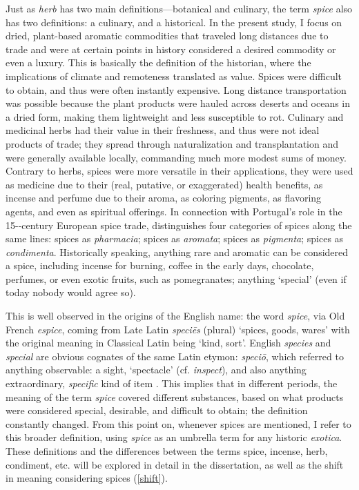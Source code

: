 Just as \textit{herb} has two main definitions---botanical and culinary, the term \textit{spice} also has two definitions: a culinary, and a historical. In the present study, I focus on dried, plant-based aromatic commodities that traveled long distances due to trade and were at certain points in history considered a desired commodity or even a luxury. This is basically the definition of the historian, where the implications of climate and remoteness translated as value. Spices were difficult to obtain, and thus were often instantly expensive. Long distance transportation was possible because the plant products were hauled across deserts and oceans in a dried form, making them lightweight and less susceptible to rot. Culinary and medicinal herbs had their value in their freshness, and thus were not ideal products of trade; they spread through naturalization and transplantation and were generally available locally, commanding much more modest sums of money. Contrary to herbs, spices were more versatile in their applications, they were used as medicine due to their (real, putative, or exaggerated) health benefits, as incense and perfume due to their aroma, as coloring pigments, as flavoring agents, and even as spiritual offerings. In connection with Portugal's role in the 15--century European spice trade, \textcite{halikowski_smith_portugal_2001} distinguishes four categories of spices along the same lines: spices as \textit{pharmacia}; spices as \textit{aromata}; spices as \textit{pigmenta}; spices as \textit{condimenta}. Historically speaking, anything rare and aromatic can be considered a spice, including incense for burning, coffee in the early days, chocolate, perfumes, or even exotic fruits, such as pomegranates; anything `special' (even if today nobody would agree so).

This is well observed in the origins of the English name: the word \textit{spice}, via Old French \textit{espice}, coming from Late Latin \textit{speciēs} (plural) `spices, goods, wares' with the original meaning in Classical Latin being `kind, sort'. English \textit{species} and \textit{special} are obvious cognates of the same Latin etymon: \textit{speciō}, which referred to anything observable: a sight, `spectacle' (cf. \textit{inspect}), and also anything extraordinary, \textit{specific} kind of item \autocite[1983-84]{glare_oxford_2012}. This implies that in different periods, the meaning of the term \textit{spice} covered different substances, based on what products were considered special, desirable, and difficult to obtain; the definition constantly changed. From this point on, whenever spices are mentioned, I refer to this broader definition, using \textit{spice} as an umbrella term for any historic \textit{exotica}. These definitions and the differences between the terms spice, incense, herb, condiment, etc. will be explored in detail in the dissertation, as well as the shift in meaning considering spices (\cref{shift}).


